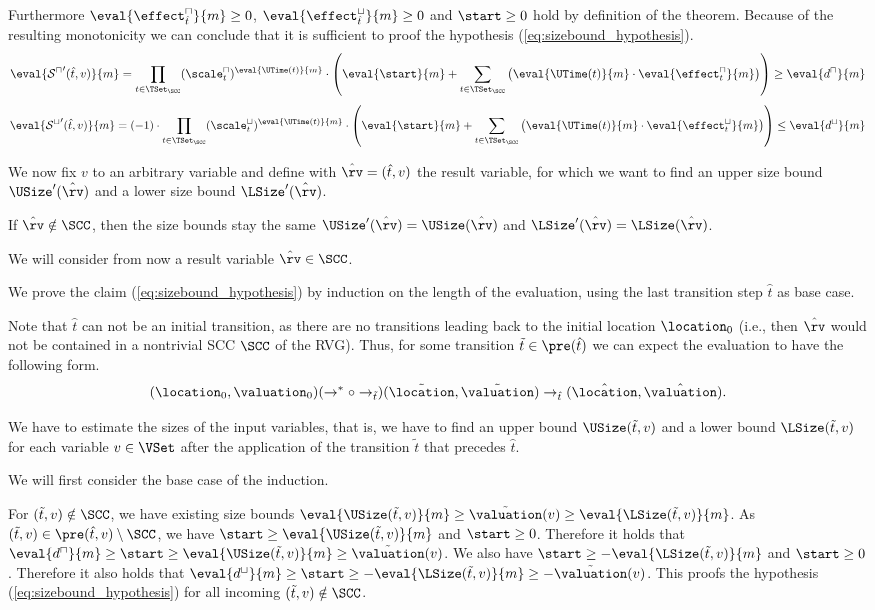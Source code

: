 Furthermore $\eval{\effect^\sqcap_{\hat{t}}}{m} \geq 0$, $\eval{\effect^\sqcup_{\hat{t}}}{m} \geq 0$ and $\start \geq 0$ hold by definition of the theorem.
Because of the resulting monotonicity we can conclude that it is sufficient to proof the hypothesis (\ref{eq:sizebound_hypothesis}). 
\[ \eval{{\mathcal{S}^\sqcap}'(\hat{t},v)}{m} =
   \prod_{t \in \TSet_\SCC} (\scale^\sqcap_t)^{\eval{\UTime(t)}{m}} \cdot \left( \eval{\start}{m} + \sum_{t \in \TSet_\SCC} \left( \eval{\UTime(t)}{m} \cdot \eval{\effect^\sqcap_t}{m} \right) \right) \geq \eval{d^\sqcap}{m} \]
\[ \eval{{\mathcal{S}^\sqcup}'(\hat{t},v)}{m} =
   (-1) \cdot \prod_{t \in \TSet_\SCC} (\scale^\sqcup_t)^{\eval{\UTime(t)}{m}} \cdot \left( \eval{\start}{m} + \sum_{t \in \TSet_\SCC} \left( \eval{\UTime(t)}{m} \cdot \eval{\effect^\sqcup_t}{m} \right) \right) \leq \eval{d^\sqcup}{m} \]

We now fix $v$ to an arbitrary variable and define with $\hat{\rv} = (\hat{t}, v)$ the result variable, for which we want to find an upper size bound $\USize'(\hat{\rv})$ and a lower size bound $\LSize'(\hat{\rv})$.

If $\hat{\rv} \notin \SCC$, then the size bounds stay the same $\USize'(\hat{\rv}) = \USize(\hat{\rv})$ and $\LSize'(\hat{\rv}) = \LSize(\hat{\rv})$.

We will consider from now a result variable $\hat{\rv} \in \SCC$.

We prove the claim (\ref{eq:sizebound_hypothesis}) by induction on the length of the evaluation, using the last transition step $\hat{t}$ as base case.

Note that $\hat{t}$ can not be an initial transition, as there are no transitions leading back to the initial location $\location_0$
(i.e., then $\hat{\rv}$ would not be contained in a nontrivial SCC $\SCC$ of the RVG).
Thus, for some transition $\tilde{t} \in \pre(\hat{t})$ we can expect the evaluation to have the following form.
\[ (\location_0, \valuation_0) (\rightarrow^* \circ \rightarrow_{\tilde{t}}) (\tilde{\location}, \tilde{\valuation}) \rightarrow_{\hat{t}} (\hat{\location}, \hat{\valuation}). \]

We have to estimate the sizes of the input variables, that is, we have to find an upper bound $\USize(\tilde{t}, v)$ and a lower bound $\LSize(\tilde{t}, v)$ for each variable $v \in \VSet$ after the application of the transition $\tilde{t}$ that precedes $\hat{t}$.

We will first consider the base case of the induction.

For $(\tilde{t}, v) \notin \SCC$, we have existing size bounds $\eval{\USize(\tilde{t}, v)}{m} \geq \tilde{\valuation}(v) \geq \eval{\LSize(\tilde{t}, v)}{m}$.
As $(\tilde{t}, v) \in \pre(\hat{t}, v) \setminus \SCC$, we have $\start \geq \eval{\USize(\tilde{t}, v)}{m}$ and $\start \geq 0$.
Therefore it holds that $\eval{d^\sqcap}{m} \geq \start \geq \eval{\USize(\tilde{t}, v)}{m} \geq \tilde{\valuation}(v)$.
We also have $\start \geq -\eval{\LSize(\tilde{t}, v)}{m}$ and $\start \geq 0$.
Therefore it also holds that $\eval{d^\sqcup}{m} \geq \start \geq -\eval{\LSize(\tilde{t}, v)}{m} \geq -\tilde{\valuation}(v)$.
This proofs the hypothesis (\ref{eq:sizebound_hypothesis}) for all incoming $(\tilde{t}, v) \notin \SCC$.

